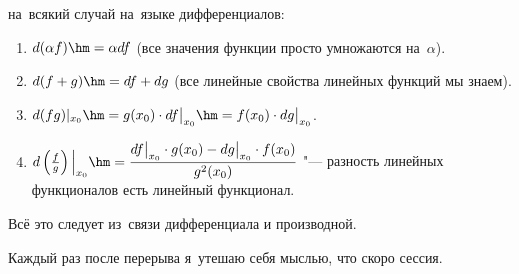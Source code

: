 \documentclass[a4paper,10pt,twoside]{article}
\begin{document}
 на~всякий случай на~языке дифференциалов:

 \begin{enumerate}
\item $d(\alpha f)\hm=\alpha df$ (все значения функции просто умножаются на~$\alpha$).

\item $d(f+g)\hm=df+dg$ (все линейные свойства линейных функций мы знаем).

\item $d(fg)|_{x_0}\hm=g(x_0)\cdot df\big|_{x_0}\hm=f(x_0)\cdot dg\big|_{x_0}$.

\item $d\left(\frac fg\right)\Big|_{x_0}\hm=\dfrac{df\big|_{x_0}\cdot g(x_0)- dg\big|_{x_0}\cdot f(x_0)}{g^2(x_0)}$ "--- разность линейных функционалов есть линейный функционал.
 \end{enumerate}

 Всё это следует из~связи дифференциала и производной.

 Каждый раз после перерыва я~утешаю себя мыслью, что скоро сессия.
\end{document}
